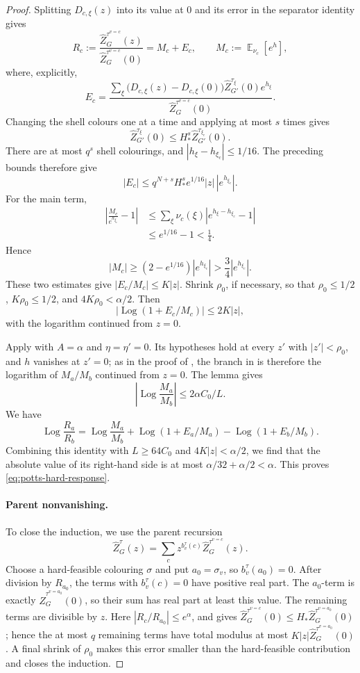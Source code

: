 \documentclass[11pt,reqno]{article}
\theoremstyle{plain}
\theoremstyle{definition}
\theoremstyle{remark}
\theoremstyle{definition}
\theoremstyle{remark}
\newcommand{\abs}[1]{\left|#1\right|}
\newcommand{\Log}{\operatorname{Log}}          %
\DeclareMathOperator{\E}{\mathbb{E}}
\newcommand{\bcount}{b}
\newcommand{\nZpin}[2]{\widehat Z_{#1}^{#2}}
\begin{document}
\begin{proof}
Splitting \(D_{c,\xi}(z)\) into its value at \(0\) and its error in the
separator identity gives
\[
  R_c:=\frac{\nZpin{G}{\tau^{v=c}}(z)}
             {\nZpin{G}{\tau^{v=c}}(0)}
      =M_c+E_c,
  \qquad
  M_c:=\E_{\nu_c}[e^h],
\]
where, explicitly,
\[
  E_c=
  \frac{
    \sum_\xi
      \bigl(D_{c,\xi}(z)-D_{c,\xi}(0)\bigr)
      \nZpin{G'}{\tau_\xi}(0)e^{h_\xi}
  }{
      \nZpin{G}{\tau^{v=c}}(0)
  }.
\]
Changing the shell colours one at a time and applying
 at most \(s\) times gives
\[
  \nZpin{G'}{\tau_\xi}(0)
  \le H_*^s\nZpin{G'}{\tau_{\xi_c}}(0).
\]
There are at most \(q^s\) shell colourings, and
\(|h_\xi-h_{\xi_c}|\le1/16\).  The preceding bounds therefore give
\[
  |E_c|
  \le q^{N+s}H_*^s e^{1/16}|z|\,|e^{h_{\xi_c}}|.
\]
For the main term,
\[
\begin{aligned}
  \left|\frac{M_c}{e^{h_{\xi_c}}}-1\right|
  &\le \sum_\xi\nu_c(\xi)
      \left|e^{h_\xi-h_{\xi_c}}-1\right|\\
  &\le e^{1/16}-1<\frac14.
\end{aligned}
\]
Hence
\[
  |M_c|\ge(2-e^{1/16})|e^{h_{\xi_c}}|
  >\frac34|e^{h_{\xi_c}}|.
\]
These two estimates give
\(|E_c/M_c|\le K|z|\).  Shrink \(\rho_0\), if necessary, so that
\(\rho_0\le1/2\), \(K\rho_0\le1/2\), and
\(4K\rho_0<\alpha/2\).  Then
\[
  \left|\Log(1+E_c/M_c)\right|
  \le2K|z|,
\]
with the logarithm continued from \(z=0\).

Apply  with \(A=\alpha\) and \(\eta=\eta'=0\).  Its
hypotheses hold at every \(z'\) with \(|z'|<\rho_0\), and \(h\) vanishes
at \(z'=0\); as in the proof of , the
branch in  is therefore the logarithm of \(M_a/M_b\)
continued from \(z=0\).  The lemma gives
\[
  \left|\Log\frac{M_a}{M_b}\right|\le2\alpha C_0/L.
\]
We have
\[
  \Log\frac{R_a}{R_b}
  =\Log\frac{M_a}{M_b}
   +\Log(1+E_a/M_a)-\Log(1+E_b/M_b).
\]
Combining this identity with \(L\ge64C_0\) and
\(4K|z|<\alpha/2\), we find that the absolute value of its right-hand
side is at most \(\alpha/32+\alpha/2<\alpha\).  This proves
\eqref{eq:potts-hard-response}.

\paragraph{Parent nonvanishing.}
To close the induction, we use the parent recursion
\[
  \nZpin{G}{\tau}(z)
  =\sum_c z^{\bcount_v^\tau(c)}\nZpin{G}{\tau^{v=c}}(z).
\]
Choose a hard-feasible colouring \(\sigma\) and put \(a_0=\sigma_v\), so
\(\bcount_v^\tau(a_0)=0\).  After division by \(R_{a_0}\), the terms with
\(\bcount_v^\tau(c)=0\) have positive real part.  The \(a_0\)-term is
exactly \(\nZpin{G}{\tau^{v=a_0}}(0)\), so their sum has real part at
least this value.  The remaining terms are
divisible by \(z\).  Here
\(\abs{R_c/R_{a_0}}\le e^\alpha\), and 
gives \(\nZpin{G}{\tau^{v=c}}(0)\le H_*\nZpin{G}{\tau^{v=a_0}}(0)\);
hence the at most \(q\) remaining terms have total modulus at most
\(K|z|\nZpin{G}{\tau^{v=a_0}}(0)\).  A final shrink of
\(\rho_0\) makes this error smaller than the hard-feasible contribution
and closes the induction.
\end{proof}
\end{document}
